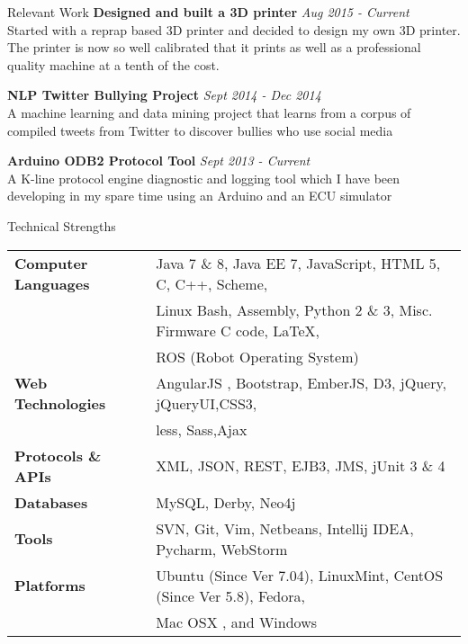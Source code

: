 \documentclass{resume} %
\begin{document}
\begin{rSection}{Relevant Work}
{\bf Designed and built a 3D printer} \hfill {\em Aug 2015 - Current} \\ 
Started with a reprap based 3D printer and decided to design my own 3D printer. The printer is now so well calibrated that it prints as well as a professional quality machine at a tenth of the cost.

{\bf NLP Twitter Bullying Project} \hfill {\em Sept 2014 - Dec 2014} \\ 
A machine learning and data mining project that learns from a corpus of compiled tweets from Twitter to discover bullies who use social media

{\bf Arduino ODB2 Protocol Tool} \hfill {\em Sept 2013 - Current} \\ 
A K-line protocol engine diagnostic and logging tool which I have been developing in my spare time using an Arduino and an ECU simulator  \smallskip \\

\end{rSection}



\begin{rSection}{Technical Strengths}

\begin{tabular}{ @{} >{\bfseries}l @{\hspace{6ex}} l }
Computer Languages & Java 7 \& 8, Java EE 7, JavaScript,  HTML 5, C, C++,  Scheme,\\
 					&  Linux Bash, Assembly, Python 2 \& 3, Misc. Firmware C code, \LaTeX,\\
 					&  ROS (Robot Operating System) \\
Web Technologies & AngularJS , Bootstrap, EmberJS, D3, jQuery, jQueryUI,CSS3,\\
				&  less, Sass,Ajax \\	
Protocols \& APIs & XML, JSON,  REST, EJB3, JMS, jUnit 3 \& 4 \\
         Databases & MySQL, Derby, Neo4j \\
			 Tools & SVN, Git, Vim, Netbeans, Intellij IDEA, Pycharm, WebStorm \\
		 Platforms & Ubuntu (Since Ver 7.04), LinuxMint, CentOS (Since Ver 5.8), Fedora, \\
 & Mac OSX , and Windows \\
\end{tabular}

\end{rSection}
\end{document}
